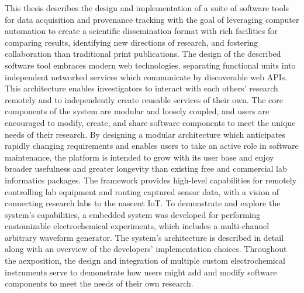 \documentclass[../thesis]{subfiles}
\begin{document}
This thesis describes the design and implementation of a suite of
software tools for data acquisition and provenance
tracking with the goal of leveraging computer automation to create a
scientific dissemination format with rich facilities for
comparing results, identifying new directions of research, and fostering
collaboration than traditional print publications. The design of the
described software tool embraces modern web technologies, separating
functional units into independent networked services which communicate
by discoverable web \glspl{API}. This architecture enables investigators to
interact with each others' research remotely and to independently
create reusable services of their own. The core components of the system are
modular and loosely coupled, and users are encouraged to modify,
create, and share software components to meet the unique needs of
their research. By designing a modular architecture which anticipates rapidly
changing requirements and enables users to take an active role in
software maintenance, the platform is intended to grow with its user
base and enjoy broader usefulness and greater longevity than existing
free and commercial lab informatics packages.
The framework provides high-level capabilities for
remotely controlling lab equipment and routing captured sensor data,
with a vision of connecting research labs to the nascent \gls{IoT}. To
demonstrate and explore the system's capabilities, a
embedded system was developed for performing customizable
electrochemical experiments, which includes a multi-channel arbitrary
waveform generator. The system's architecture is described in detail
along with an overview of the developers' implementation
choices. Throughout the aexposition, the design and integration of
multiple custom electrochemical instruments serve to demonstrate how
users might add and modify software components to meet the needs of
their own research.
\end{document}
